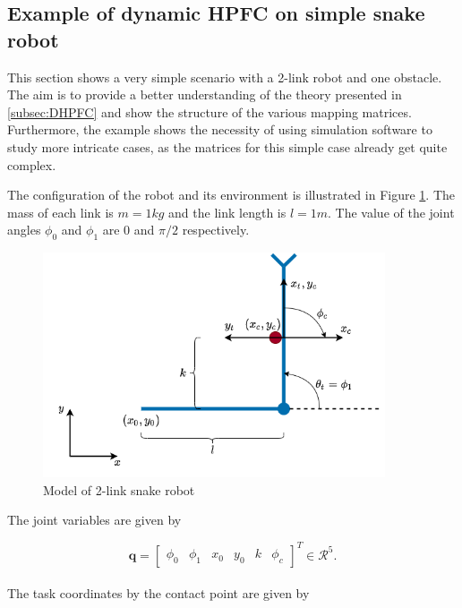 
\subsection{Example of dynamic HPFC on simple snake robot}

This section shows a very simple scenario with a 2-link robot and one obstacle. The aim is to provide a better understanding of the theory presented in \ref{subsec:DHPFC} and show the structure of the various mapping matrices.
Furthermore, the example shows the necessity of using simulation software to study more intricate cases, as the matrices for this simple case already get quite complex.

The configuration of the robot and its environment is illustrated in Figure \ref{fig:ex_2link}. %
The mass of each link is $m = 1 kg$ and the link length is $l=1 m$. The value of the joint angles $\phi_0$ and $\phi_1$ are $0$ and $\pi/2$ respectively.

\begin{figure}
    \centering
    \includegraphics[width=0.9\textwidth]{figures/theory/example_2link.png}
    \caption{Model of 2-link snake robot}
    \label{fig:ex_2link}
\end{figure}

The joint variables are given by

\begin{equation}
    \mathbf{q} =
    \begin{bmatrix}
        \phi_0 & \phi_1 & x_0 & y_0 & k & \phi_c
    \end{bmatrix}^T \in \mathcal{R}^5.
\end{equation}
\\
The task coordinates by the contact point are given by

